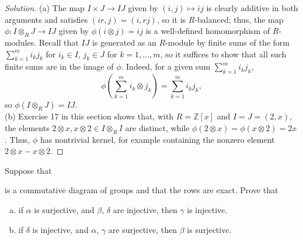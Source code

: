 \documentclass[10pt]{article}
\providecommand{\ZZ}{\mathbb Z}
\providecommand{\ii}{\item}
\newenvironment{soln}{\begin{proof}[Solution]}{\end{proof}}
\begin{document}
\begin{soln}
    (a) The map $I\times J\to IJ$ given by $(i,j)\mapsto ij$
    is clearly additive in both arguments
    and satisfies $(ir,j) = (i,rj)$, so it is $R$-balanced;
    thus, the map $\phi\colon I\otimes_RJ\to IJ$ given by
    $\phi(i\otimes j) = ij$ is a well-defined homomorphism of $R$-modules.
    Recall that $IJ$ is generated as an $R$-module
    by finite sums of the form
    $\sum_{k=1}^m i_kj_k$ for $i_k\in I$, $j_k\in J$ for $k=1,\dots,m$,
    so it suffices to show that all such finite sums
    are in the image of $\phi$.
    Indeed, for a given sum $\sum_{k=1}^m i_kj_k$,
    \begin{equation*}
	\phi\left(\sum_{k=1}^m i_k\otimes j_k\right)
	= \sum_{k=1}^m i_kj_k,
    \end{equation*}
    so $\phi(I\otimes_RJ) = IJ$.
    \\

    (b) Exercise 17 in this section shows that,
    with $R = \ZZ[x]$ and $I = J = (2,x)$,
    the elements $2\otimes x,x\otimes2\in I\otimes_RI$ are distinct,
    while $\phi(2\otimes x) = \phi(x\otimes 2) = 2x$.
    Thus, $\phi$ has nontrivial kernel, for example
    containing the nonzero element $2\otimes x - x\otimes 2$.
\end{soln}

\pagebreak
\begin{problem}
    [\S10.5\#2]
    Suppose that
    \begin{center}
    \end{center}
    is a commutative diagram of groups and that the rows are exact.
    Prove that
    \begin{enumerate}[(a)]
        \ii if $\alpha$ is surjective, and $\beta$, $\delta$ are injective,
	then $\gamma$ is injective.
	\ii if $\delta$ is injective, and $\alpha$, $\gamma$ are surjective,
	then $\beta$ is surjective.
    \end{enumerate}
\end{problem}
\end{document}
